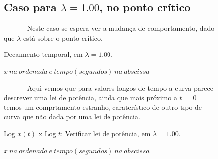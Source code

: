 \documentclass[pdftex,12pt,a4paper]{article}
\begin{document}
\begin{figure}
\subsection{Caso para $\lambda = 1.00$, no ponto crítico}
~~~~~~ Neste caso se espera ver a mudança de comportamento, dado que $\lambda$ está sobre o ponto crítico.

\centering
\caption{Decaimento temporal, em $\lambda = 1.00$.}
\caption*{$x\ na\ ordenada\ e\ tempo(segundos)\ na\ abscissa$}
\end{figure}

\begin{figure}
~~~~~~ Aqui vemos que para valores longos de tempo a curva parece descrever uma lei de potência, ainda que mais próximo a $t\ = 0$ temos um comprtamento estranho, caraterístico de outro tipo de curva que não dada por uma lei de potência.

\centering
\caption{Log $x(t)$ x Log $t$: Verificar lei de potência, em $\lambda = 1.00$.}
\caption*{$x\ na\ ordenada\ e\ tempo(segundos)\ na\ abscissa$}
\end{figure}
\end{document}
